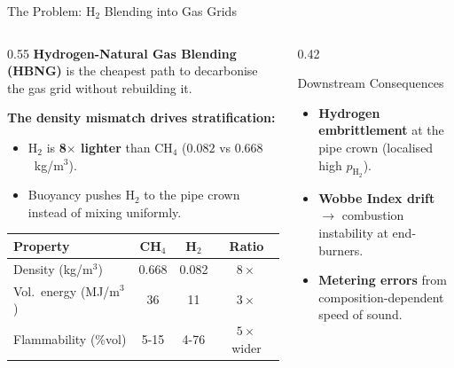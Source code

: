 \documentclass[10pt, aspectratio=169]{beamer}
\begin{document}
\begin{frame}{The Problem: H\texorpdfstring{$_2$}{2} Blending into Gas Grids}
    \begin{columns}[T]
        \begin{column}{0.55\textwidth}
            \textbf{Hydrogen-Natural Gas Blending (HBNG)} is the cheapest
            path to decarbonise the gas grid without rebuilding it.

            \vspace{0.6em}
            \textbf{The density mismatch drives stratification:}
            \begin{itemize}
                \item H$_2$ is \textbf{8$\times$ lighter} than CH$_4$
                      ($0.082$ vs $0.668$~kg/m$^3$).
                \item Buoyancy pushes H$_2$ to the pipe crown instead
                      of mixing uniformly.
            \end{itemize}

            \vspace{0.6em}
            \begin{table}
                \centering\scriptsize
                \begin{tabular}{@{}lccc@{}}
                    \toprule
                    \textbf{Property} & \textbf{CH$_4$} & \textbf{H$_2$} & \textbf{Ratio} \\
                    \midrule
                    Density (kg/m$^3$) & 0.668 & 0.082 & $8\times$ \\
                    Vol.\ energy (MJ/m$^3$) & 36 & 11 & $3\times$ \\
                    Flammability (\%vol) & 5-15 & 4-76 & $5\times$ wider \\
                    \bottomrule
                \end{tabular}
            \end{table}
        \end{column}
        \begin{column}{0.42\textwidth}
            \begin{alertblock}{Downstream Consequences}
                \small
                \begin{itemize}
                    \item \textbf{Hydrogen embrittlement} at the pipe
                          crown (localised high $p_{\text{H}_2}$).
                    \item \textbf{Wobbe Index drift} $\to$ combustion
                          instability at end-burners.
                    \item \textbf{Metering errors} from
                          composition-dependent speed of sound.
                \end{itemize}
            \end{alertblock}


\end{column}
\end{columns}
\end{frame}
\end{document}
